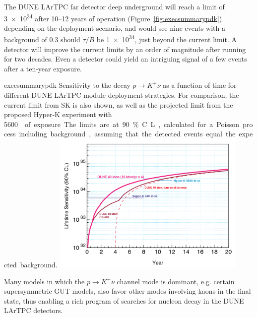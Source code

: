 The DUNE LArTPC far detector deep underground will reach a limit of
\SI{3e34}{\year} after 10--12 years of operation
(Figure~\ref{fig:execsummarypdk}) depending on the deployment
scenario, and would see nine events with a background of 0.3 should
$\tau/B$ be \SI{1e34}{\year}, just beyond the current limit. A
 detector will improve the current limits by an order of
magnitude after running for two decades. Even a  detector
could yield an intriguing signal of a few events after a ten-year
exposure.



\begin{cdrfigure}{execsummarypdk} {Sensitivity to the
    decay $p\to K^+ \bar{\nu}$ as a function of time for different DUNE 
LArTPC module deployment strategies. 
  For comparison, the current limit from SK is also shown, as well as the projected limit from the proposed Hyper-K experiment with \SI{5600}\ktyr{} of exposure.
  The limits are at 90\% C.L., calculated for
  a Poisson process including background, assuming that the detected events
  equal the expected background.}
\includegraphics[width=0.7\textwidth]{volume-physics/figures/lar4x10.png}
\end{cdrfigure}

Many models in which the $p\to K^+\overline{\nu}$ channel mode is
dominant, e.g. certain supersymmetric GUT models, also favor other
modes involving kaons in the final state, thus enabling a rich program
of searches for nucleon decay in the DUNE LArTPC detectors.


